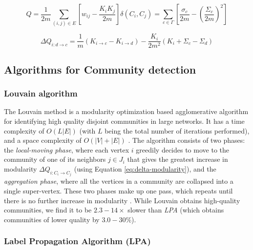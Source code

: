 \begin{equation}
\label{eq:modularity}
  Q
  = \frac{1}{2m} \sum_{(i, j) \in E} \left[w_{ij} - \frac{K_i K_j}{2m}\right] \delta(C_i, C_j)
  = \sum_{c \in \Gamma} \left[\frac{\sigma_c}{2m} - \left(\frac{\Sigma_c}{2m}\right)^2\right]
\end{equation}

\begin{equation}
\label{eq:delta-modularity}
  \Delta Q_{i: d \rightarrow c}
  = \frac{1}{m} (K_{i \rightarrow c} - K_{i \rightarrow d}) - \frac{K_i}{2m^2} (K_i + \Sigma_c - \Sigma_d)
\end{equation}




\subsection{Algorithms for Community detection}

\subsubsection{Louvain algorithm \cite{com-blondel08}}
\label{sec:about-louvain}

The Louvain method is a modularity optimization based agglomerative algorithm for identifying high quality disjoint communities in large networks. It has a time complexity of $O (L |E|)$ (with $L$ being the total number of iterations performed), and a space complexity of $O(|V| + |E|)$ \cite{com-lancichinetti09}. The algorithm consists of two phases: the \textit{local-moving phase}, where each vertex $i$ greedily decides to move to the community of one of its neighbors $j \in J_i$ that gives the greatest increase in modularity $\Delta Q_{i:C_i \rightarrow C_j}$ (using Equation \ref{eq:delta-modularity}), and the \textit{aggregation phase}, where all the vertices in a community are collapsed into a single super-vertex. These two phases make up one pass, which repeats until there is no further increase in modularity \cite{com-blondel08, com-leskovec21}. While Louvain obtains high-quality communities, we find it to be $2.3 - 14\times$ slower than \textit{LPA} (which obtains communities of lower quality by $3.0 - 30\%$).


\subsubsection{Label Propagation Algorithm (LPA) \cite{com-raghavan07}}
\label{sec:about-rak}

